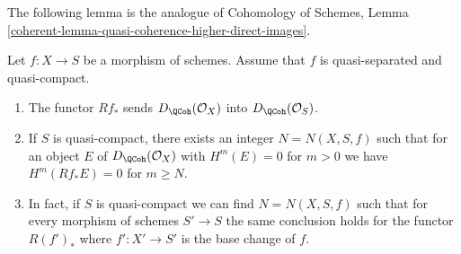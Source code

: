 \noindent
The following lemma is the analogue of
Cohomology of Schemes, Lemma
\ref{coherent-lemma-quasi-coherence-higher-direct-images}.

\begin{lemma}
\label{lemma-quasi-coherence-direct-image}
Let $f : X \to S$ be a morphism of schemes.
Assume that $f$ is quasi-separated and quasi-compact.
\begin{enumerate}
\item The functor $Rf_*$ sends $D_\QCoh(\mathcal{O}_X)$
into $D_\QCoh(\mathcal{O}_S)$.
\item If $S$ is quasi-compact, there exists an integer $N = N(X, S, f)$
such that for an object $E$ of $D_\QCoh(\mathcal{O}_X)$
with $H^m(E) = 0$ for $m > 0$ we have
$H^m(Rf_*E) = 0$ for $m \geq N$.
\item In fact, if $S$ is quasi-compact we can find $N = N(X, S, f)$
such that for every morphism of schemes $S' \to S$
the same conclusion holds for the functor $R(f')_*$
where $f' : X' \to S'$ is the base change of $f$.
\end{enumerate}
\end{lemma}

